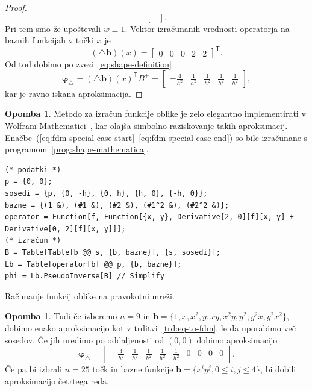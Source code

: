 \documentclass[12pt,a4paper,twoside]{article}
\theoremstyle{definition} %
\newtheorem{opomba}[definicija]{Opomba}
\theoremstyle{plain} %
\numberwithin{equation}{section}
\newcommand{\T}{\mathsf{T}}
\newcommand{\lap}{\triangle}
\renewcommand{\b}{\boldsymbol}
\renewcommand{\phi}{\varphi}
\begin{document}
\begin{proof}
\begin{equation}
\begin{bmatrix}
  \end{bmatrix}.
\end{equation}
Pri tem smo že upoštevali $w \equiv 1$.
Vektor izračunanih vrednosti operatorja na baznih funkcijah v točki $x$ je
\begin{equation}
   (\lap \b{b})(x) = \begin{bmatrix} 0 & 0 & 0 & 2 & 2 \end{bmatrix}^\T.
\end{equation}
Od tod dobimo po zvezi~\eqref{eq:shape-definition}
\begin{equation}
  \label{eq:fdm-special-case-end}
  \b\phi_\lap = (\lap \b b)(x)^\T B^{+} =
  \begin{bmatrix}
    -\frac{4}{h^2} & \frac{1}{h^2} & \frac{1}{h^2} & \frac{1}{h^2} &
    \frac{1}{h^2}
  \end{bmatrix},
\end{equation}
kar je ravno iskana aproksimacija.
\end{proof}
\begin{opomba}
  Metodo za izračun funkcije oblike je zelo elegantno implementirati v
  Wolfram Mathematici~\cite{mathematica}, kar olajša simbolno raziskovanje takih aproksimacij.
  Enačbe~(\ref{eq:fdm-special-case-start}--\ref{eq:fdm-special-case-end}) so bile izračunane s
  programom~\ref{prog:shape-mathematica}.

\begin{listing}[!h]
    \vspace{-1ex}
  \begin{verbatim}
(* podatki *)
p = {0, 0};
sosedi = {p, {0, -h}, {0, h}, {h, 0}, {-h, 0}};
bazne = {(1 &), (#1 &), (#2 &), (#1^2 &), (#2^2 &)};
operator = Function[f, Function[{x, y}, Derivative[2, 0][f][x, y] + Derivative[0, 2][f][x, y]]];
(* izračun *)
B = Table[Table[b @@ s, {b, bazne}], {s, sosedi}];
Lb = Table[operator[b] @@ p, {b, bazne}];
phi = Lb.PseudoInverse[B] // Simplify
  \end{verbatim}
  \vspace{-3ex}
  \caption{Računanje funkcij oblike na pravokotni mreži.}
  \label{prog:shape-mathematica}
  \end{listing}
\end{opomba}
\begin{opomba}
  \label{op:fdm-9}
  Tudi če izberemo $n=9$ in $\b b = \{1, x, x^2, y, xy, x^2y, y^2, y^2x, y^2
  x^2 \}$, dobimo enako aproksimacijo kot v trditvi~\ref{trd:eq-to-fdm}, le da
  uporabimo več sosedov. Če jih uredimo po oddaljenosti od $(0, 0)$ dobimo
  aproksimacijo
  \begin{equation}
    \b\phi_\lap =  \begin{bmatrix}
    -\frac{4}{h^2} & \frac{1}{h^2} & \frac{1}{h^2} & \frac{1}{h^2} &
    \frac{1}{h^2} & 0 & 0 & 0 & 0
  \end{bmatrix}.
    \label{eq:shape-mon9}
  \end{equation}
 Če pa bi izbrali $n=25$ točk in bazne funkcije $\b b = \{x^iy^j, 0 \leq i, j
 \leq 4 \}$, bi dobili aproksimacijo četrtega reda.
\end{opomba}
\end{document}
